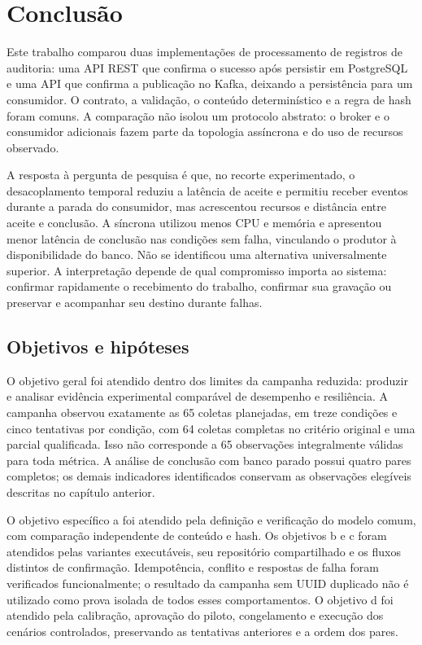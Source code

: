 \chapter{Conclusão}
\label{cap:conclusao}

Este trabalho comparou duas implementações de processamento de registros de auditoria: uma API REST que confirma o sucesso após persistir em PostgreSQL e uma API que confirma a publicação no Kafka, deixando a persistência para um consumidor. O contrato, a validação, o conteúdo determinístico e a regra de hash foram comuns. A comparação não isolou um protocolo abstrato: o broker e o consumidor adicionais fazem parte da topologia assíncrona e do uso de recursos observado.

A resposta à pergunta de pesquisa é que, no recorte experimentado, o desacoplamento temporal reduziu a latência de aceite e permitiu receber eventos durante a parada do consumidor, mas acrescentou recursos e distância entre aceite e conclusão. A síncrona utilizou menos CPU e memória e apresentou menor latência de conclusão nas condições sem falha, vinculando o produtor à disponibilidade do banco. Não se identificou uma alternativa universalmente superior. A interpretação depende de qual compromisso importa ao sistema: confirmar rapidamente o recebimento do trabalho, confirmar sua gravação ou preservar e acompanhar seu destino durante falhas.

\section{Objetivos e hipóteses}

O objetivo geral foi atendido dentro dos limites da campanha reduzida: produzir e analisar evidência experimental comparável de desempenho e resiliência. A campanha observou exatamente as 65 coletas planejadas, em treze condições e cinco tentativas por condição, com 64 coletas completas no critério original e uma parcial qualificada. Isso não corresponde a 65 observações integralmente válidas para toda métrica. A análise de conclusão com banco parado possui quatro pares completos; os demais indicadores identificados conservam as observações elegíveis descritas no capítulo anterior.

O objetivo específico a foi atendido pela definição e verificação do modelo comum, com comparação independente de conteúdo e hash. Os objetivos b e c foram atendidos pelas variantes executáveis, seu repositório compartilhado e os fluxos distintos de confirmação. Idempotência, conflito e respostas de falha foram verificados funcionalmente; o resultado da campanha sem UUID duplicado não é utilizado como prova isolada de todos esses comportamentos. O objetivo d foi atendido pela calibração, aprovação do piloto, congelamento e execução dos cenários controlados, preservando as tentativas anteriores e a ordem dos pares.

